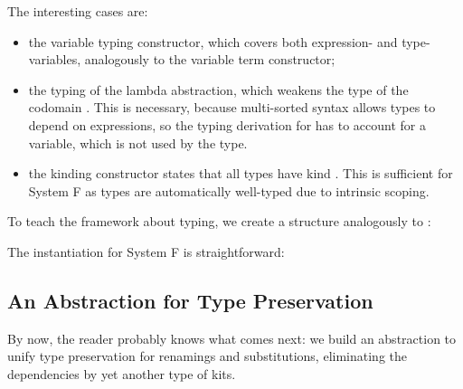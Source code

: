 \documentclass[a4paper, UKenglish, cleveref, autoref, thm-restate]{lipics-v2021}
\newenvironment{LibCode*}{%
  \begin{tcolorbox}[%
    colframe=white,%
    boxrule=0.0pt,%
    top=2.5pt,%
    left=2.5pt,%
    bottom=2.5pt,%
    right=2.5pt,%
    boxsep=0pt%
  ]\vspace{-0.2\baselineskip}%
}{%
  \vspace{-1\baselineskip}%
  \end{tcolorbox}%
}
\newcommand*\LibCode[1]{\begin{LibCode*}{#1}\end{LibCode*}}
\newcommand*\AppCode[1]{{#1}}
\newcommand*\ACode[1]{\AgdaFontStyle{\textcolor{mygray}{#1}}}
\newcommand*\ACon[1]{\AgdaInductiveConstructor{#1}}
\begin{document}

  The interesting cases are:
  \begin{itemize}
  \item
    the variable typing constructor, which covers both expression- and
    type-variables, analogously to the variable term constructor;
  \item
    the typing \ACode{\ACon{⊢λ}} of the lambda abstraction, which
    weakens the type of the codomain \ACode{t₂}.
    This is necessary, because multi-sorted syntax allows types
    to depend on expressions, so the typing derivation for \ACode{e}
    has to account for a variable, which is not used by the type.
  \item
    the kinding constructor \ACode{\ACon{⊢τ}} states that all types
    have kind \ACode{\ACon{★}}. This is sufficient for System F as types
    are automatically well-typed due to intrinsic scoping.
  \end{itemize}
  To teach the framework about typing, we create a structure analogously to
  \ACode{\ACon{Syntax}}:
  \LibCode\KTyping
  The instantiation for System F is straightforward:
  \AppCode\FTypingInst

  \subsection{An Abstraction for Type Preservation}
  By now, the reader probably knows what comes next: we build an
  abstraction to unify type preservation for renamings and substitutions,
  eliminating the dependencies by yet another type of kits.
\end{document}
